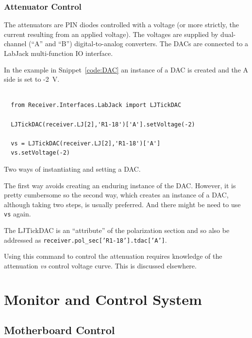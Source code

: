 \documentclass[letterpaper,11pt]{book}
\begin{document}
\subsection{Attenuator Control}

The attenuators are PIN diodes
controlled with a voltage (or more strictly, the current resulting from an
applied voltage).  The voltages are supplied by dual-channel (``A'' and
``B'') digital-to-analog converters.  The DACs are connected to a LabJack
multi-function IO interface.

In the example in Snippet~\ref{code:DAC}
an instance of a DAC is created and the A side is set to -2~V.
\begin{code}[h!tb]
\begin{center}
\begin{verbatim}

  from Receiver.Interfaces.LabJack import LJTickDAC
  
  LJTickDAC(receiver.LJ[2],'R1-18')['A'].setVoltage(-2)
  
  vs = LJTickDAC(receiver.LJ[2],'R1-18')['A']
  vs.setVoltage(-2)\end{verbatim}
\caption{\label{code:DAC}Two ways of instantiating and setting a DAC.}  
\end{center}
\end{code}
The first way avoids creating an enduring instance of the DAC.  However, it is
pretty cumbersome so the second way, which creates an instance of a DAC,
although taking two steps, is usually preferred.  And there might be need to
use {\tt vs} again.

The LJTickDAC is an ``attribute'' of the polarization section and so also be 
addressed as {\tt receiver.pol\_sec['R1-18'].tdac['A']}.

Using this command to control the attenuation requires knowledge of the 
attenuation {\it vs} control voltage curve.  This is discussed elsewhere.


\chapter{Monitor and Control System}\label{chap:MandC}

\section{Motherboard Control}
\end{document}
